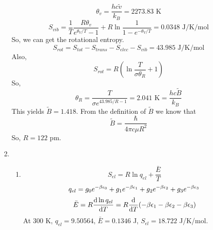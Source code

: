 \begin{solution}
\begin{enumerate}
\begin{tcolorbox}
              \end{tcolorbox}
              \begin{equation*}
                  \theta_v=\frac{hc\tilde{v}}{k_B}=2273.83\text{ K}
              \end{equation*}
              \begin{equation*}
                  S_{vib}=\frac{1}{T}\frac{R\theta_v}{e^{\theta_V/T}-1}+R\ln\frac{1}{1-e^{-\theta_V/T}}
                  =0.0348\text{ J/K/mol}
              \end{equation*}
              So, we can get the rotational entropy.
              \begin{equation*}
                  S_{rot}=S_{tot}-S_{trans}-S_{elec}-S_{vib}=43.985\text{ J/K/mol}
              \end{equation*}
              Also,
              \begin{equation*}
                  S_{rot}=R\left(\ln\frac{T}{\sigma\theta_R}+1\right)
              \end{equation*}
              So,
              \begin{equation*}
                  \theta_R=\frac{T}{\sigma e^{43.985/R-1}}=2.041\text{ K}=\frac{hc\tilde{B}}{k_B}
              \end{equation*}
              This yields $\tilde{B}=1.418$. From the definition of $\tilde{B}$ we know that
              \begin{equation*}
                  \tilde{B}=\frac{\hbar}{4\pi c\mu R^2}
              \end{equation*}
              So, $R=122$ pm.
        \item \begin{enumerate}
                  \item \begin{equation*}
                            S_{el}=R\ln q_{el}+\frac{\bar{E}}{T}
                        \end{equation*}
                        \begin{equation*}
                            q_{el}=g_0e^{-\beta\epsilon_0}+g_1e^{-\beta\epsilon_1}+g_2e^{-\beta\epsilon_2}+g_3e^{-\beta\epsilon_3}
                        \end{equation*}
                        \begin{equation*}
                            \bar{E}=R\frac{\mathrm{d} \ln q_{el}}{\mathrm{d} T}=R\frac{\mathrm{d} }{\mathrm{d} T}(-\beta\epsilon_1-\beta\epsilon_2-\beta\epsilon_3)
                        \end{equation*}
                        At 300 K, $q_{el}=9.50564$, $\bar{E}=0.1346$ J, $S_{el}=18.722$ J/K/mol.

\end{enumerate}
\end{enumerate}
\end{solution}
